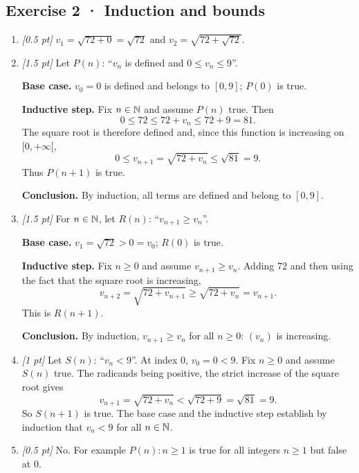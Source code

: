 \subsection*{Exercise 2 · Induction and bounds}\begin{enumerate}

\item \textit{[0.5 pt]} $v_1=\sqrt{72+0}=\sqrt{72}$ and $v_2=\sqrt{72+\sqrt{72}}$.

\item \textit{[1.5 pt]} Let $P(n)$: ``$v_n$ is defined and $0\le v_n\le 9$''.
\par\smallskip\textbf{Base case.} $v_0=0$ is defined and belongs to $[0,9]$; $P(0)$ is true.
\par\smallskip\textbf{Inductive step.} Fix $n\in\mathbb N$ and assume $P(n)$ true. Then
\[0\le 72\le 72+v_n\le 72+9=81.\]
The square root is therefore defined and, since this function is increasing on $[0,+\infty[$,
\[0\le v_{n+1}=\sqrt{72+v_n}\le\sqrt{81}=9.\]
Thus $P(n+1)$ is true.
\par\smallskip\textbf{Conclusion.} By induction, all terms are defined and belong to $[0,9]$.

\item \textit{[1.5 pt]} For $n\in\mathbb N$, let $R(n)$: ``$v_{n+1}\ge v_n$''.
\par\smallskip\textbf{Base case.} $v_1=\sqrt{72}>0=v_0$; $R(0)$ is true.
\par\smallskip\textbf{Inductive step.} Fix $n\ge0$ and assume $v_{n+1}\ge v_n$. Adding $72$ and then using the fact that the square root is increasing,
\[v_{n+2}=\sqrt{72+v_{n+1}}\ge\sqrt{72+v_n}=v_{n+1}.\]
This is $R(n+1)$.
\par\smallskip\textbf{Conclusion.} By induction, $v_{n+1}\ge v_n$ for all $n\ge0$: $(v_n)$ is increasing.

\item \textit{[1 pt]} Let $S(n)$: ``$v_n<9$''. At index $0$, $v_0=0<9$.
Fix $n\ge0$ and assume $S(n)$ true. The radicands being positive, the strict increase of the square root gives
\[v_{n+1}=\sqrt{72+v_n}<\sqrt{72+9}=\sqrt{81}=9.\]
So $S(n+1)$ is true. The base case and the inductive step establish by induction that $v_n<9$ for all $n\in\mathbb N$.

\item \textit{[0.5 pt]} No. For example $P(n):n\ge1$ is true for all integers $n\ge1$ but false at $0$.

\end{enumerate}

